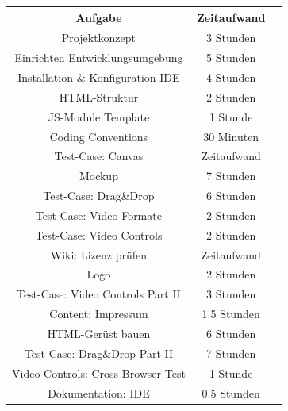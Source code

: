 \documentclass[a4paper,10pt]{scrartcl}
\begin{document}
\begin{tabular}{|c|c|c|}\hline
	\textbf{Aufgabe} & \textbf{Zeitaufwand} \\ \hline
	
	Projektkonzept & 3 Stunden \\ \hline
	
	Einrichten Entwicklungsumgebung & 5 Stunden \\ \hline
	
	Installation \& Konfiguration IDE & 4 Stunden \\ \hline
	
	HTML-Struktur & 2 Stunden \\ \hline
	
	JS-Module Template & 1 Stunde \\ \hline
	
	Coding Conventions & 30 Minuten \\ \hline
	
	Test-Case: Canvas & Zeitaufwand \\ \hline
	
	Mockup & 7 Stunden \\ \hline
	
	Test-Case: Drag\&Drop & 6 Stunden \\ \hline
	
	Test-Case: Video-Formate & 2 Stunden \\ \hline
	
	Test-Case: Video Controls & 2 Stunden \\ \hline
		
	Wiki: Lizenz prüfen & Zeitaufwand \\ \hline
	
	Logo & 2 Stunden \\ \hline
	
	Test-Case: Video Controls Part II & 3 Stunden \\ \hline
	
	Content: Impressum & 1.5 Stunden \\ \hline
	
	HTML-Gerüst bauen & 6 Stunden \\ \hline
	
	Test-Case: Drag\&Drop Part II & 7 Stunden \\ \hline
	
	Video Controls: Cross Browser Test & 1 Stunde \\ \hline
	
	Dokumentation: IDE & 0.5 Stunden \\ \hline
	

\end{tabular}
\end{document}

